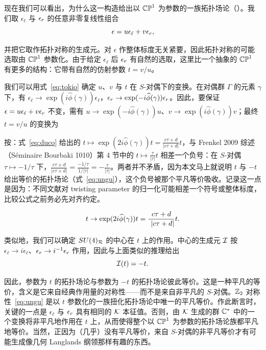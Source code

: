 现在我们可以看出，为什么这一构造给出以 $\Bbb{CP}^1$ 为参数的一族拓扑场论（\zunko）。我们取 $\epsilon_\ell$ 与 $\epsilon_\rr$ 的任意非零复线性组合 %
\setcounter{equation}{11}
\begin{equation}\label{eq:utu}
\epsilon=u\epsilon_\ell+v\epsilon_\rr,
\end{equation}

并把它取作拓扑对称的生成元。对 $\epsilon$ 作整体标度无关紧要，因此拓扑对称的可能选取由 $\Bbb{CP}^1$ 参数化。由于给定 $\epsilon_\ell$ 后 $\epsilon_\rr$ 有自然的选取，这里比一个抽象的 $\Bbb{CP}^1$ 有更多的结构：它带有自然的仿射参数 $t=v/u$。

我们可以用式~\eqref{eq:tokio} 确定 $u$、$v$ 与 $t$ 在 $S$-对偶下的变换。在对偶群 $\Gamma$ 的元素 $\gamma$ 下，有 $\epsilon_\ell\to\exp(i\hat\phi(\gamma))\epsilon_\ell$，$\epsilon_\rr\to\exp(-i\hat\phi(\gamma))\epsilon_\rr$。因此，要保证 $\epsilon=u\epsilon_\ell+v\epsilon_\rr$ 不变，需有 $u\to\exp(-i\hat\phi(\gamma))u$、$v\to\exp(i\hat\phi(\gamma))v$；最终 $t=v/u$ 的变换为

\begin{yizhu}[含糊点拨]
按：式~\eqref{eq:duco} 给出的 $t\mapsto\exp(2i\hat\phi(\gamma))t=\frac{c\tau+d}{|c\tau+d|}t$，与 Frenkel 2009 综述（Séminaire Bourbaki 1010）第 4 节中的 $t\mapsto\frac{\tau}{|\tau|}t$ 相差一个负号：在 $S$-对偶 $\tau\mapsto-1/\tau$ 下，$\frac{c\tau+d}{|c\tau+d|}=\frac{-1/\tau}{1/|\tau|}=-\frac{\tau}{|\tau|}$。两者并不矛盾，因为本文马上就说明 $t$ 与 $-t$ 给出等价的拓扑场论（式~\eqref{eq:ungu}），这个负号被那个平凡等价吸收。记录这一点是因为：不同文献对 twisting parameter 的归一化可能相差一个符号或整体标度，比较公式之前务必先对齐约定。
\end{yizhu} %
\setcounter{equation}{12}
\begin{equation}\label{eq:duco}
t\to
\exp(2i\hat\phi(\gamma))t={{c\tau+d}\over\ {|c\tau+d|}}t.
\end{equation}

类似地，我们可以确定 $SU(4)_{{\cal R}}$ 的中心在 $t$ 上的作用。中心的生成元 ${\EUI}$ 按 $\epsilon_\ell\to i\epsilon_\ell$、$\epsilon_\rr\to i^{-1}\epsilon_\rr$ 作用，因此与上面类似的推理给出 %
\setcounter{equation}{13}
\begin{equation}\label{eq:ungu}
{\EUI}(t)=-t.
\end{equation}

因此，参数为 $t$ 的拓扑场论与参数为 $-t$ 的拓扑场论彼此等价。这是一种平凡的等价，含义是它来自经典作用量的对称性——而不是来自非平凡的 $S$-对偶。$\Bbb{Z}_2$ 对称性~\eqref{eq:ungu} 是以 $t$ 参数化的一族扭化拓扑场论中唯一的平凡等价。作此断言时，关键的一点是 $\epsilon_\ell$ 与 $\epsilon_\rr$ 具有相同的 ${\cal K}$ 本征值。否则，由 ${\cal K}$ 生成的群 $\Bbb{C}^*$ 中的一个变换将非平凡地作用在 $t$ 上，从而使得整个以 $\Bbb{CP}^1$ 为参数的拓扑场论族都平凡地等价。当然，正因为（几乎）没有平凡等价，来自 $S$-对偶的非平凡等价才有可能生成像几何 Langlands 纲领那样有趣的东西。

